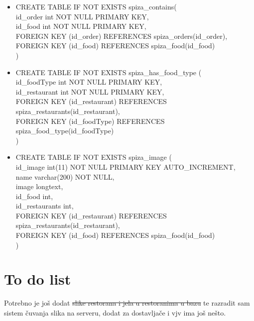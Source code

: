 \documentclass[12pt]{scrartcl}
\begin{document}
\begin{itemize}
    id\_order int NOT NULL PRIMARY KEY AUTO\_INCREMENT,\\
    id\_user int NOT NULL,\\
    id\_restaurant int NOT NULL,\\
    note varchar(50),\\
    feedback varchar(100),\\
    rating float,\\
    thumbs\_up int,\\
    thumbs\_down int, \\
    FOREIGN KEY (id\_restaurant) REFERENCES spiza\_restaurants(id\_restaurant),\\
    FOREIGN KEY (id\_user) REFERENCES spiza\textunderscore users(id\_user)\\
    )
    \item[] CREATE TABLE IF NOT EXISTS spiza\_contains(\\
    id\_order int NOT NULL PRIMARY KEY,\\
    id\_food int NOT NULL PRIMARY KEY,\\
    FOREIGN KEY (id\_order) REFERENCES spiza\_orders(id\_order),\\
    FOREIGN KEY (id\_food) REFERENCES spiza\_food(id\_food)\\
    )
    \item[] CREATE TABLE IF NOT EXISTS spiza\_has\_food\_type (\\
    id\_foodType int NOT NULL PRIMARY KEY,\\
    id\_restaurant int NOT NULL PRIMARY KEY,\\
    FOREIGN KEY (id\_restaurant) REFERENCES spiza\_restaurants(id\_restaurant),\\
    FOREIGN KEY (id\_foodType) REFERENCES spiza\_food\_type(id\_foodType)\\
    )
    \item[] CREATE TABLE IF NOT EXISTS spiza\_image (\\
    id\_image int(11) NOT NULL PRIMARY KEY AUTO\_INCREMENT,\\
    name varchar(200) NOT NULL,\\
    image longtext,\\
    id\_food int,\\
    id\_restaurants int,\\
    FOREIGN KEY (id\_restaurant) REFERENCES spiza\_restaurants(id\_restaurant),\\
    FOREIGN KEY (id\_food) REFERENCES spiza\_food(id\_food)\\
    )
\end{itemize}

\section{To do list}
Potrebno je još dodat \st{slike restorana i jela u restoranima u bazu} te razradit sam sistem čuvanja slika na serveru, dodat za dostavljače i vjv ima još nešto. 
\end{document}
